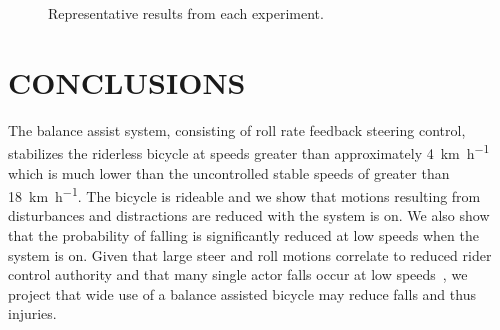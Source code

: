 \documentclass{icsc}
\def\kph{\kilo\meter\per\hour}
\begin{document}
\begin{figure}[t]
  \begin{center}
    \caption{Representative results from each experiment.}
    \label{fig:fig2}
  \end{center}
\end{figure}

\section{CONCLUSIONS}
%
The balance assist system, consisting of roll rate feedback steering control,
stabilizes the riderless bicycle at speeds greater than approximately
4~\si{\kph} which is much lower than the uncontrolled stable speeds of greater
than 18~\si{\kph}. The bicycle is rideable and we show that motions resulting
from disturbances and distractions are reduced with the system is on. We also
show that the probability of falling is significantly reduced at low speeds
when the system is on. Given that large steer and roll motions correlate to
reduced rider control authority and that many single actor falls occur at low
speeds~\cite{Wegman2024}, we project that wide use of a balance assisted
bicycle may reduce falls and thus injuries.



\end{document}
